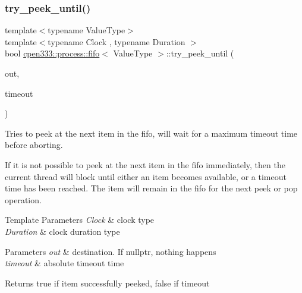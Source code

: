 \subsubsection{\texorpdfstring{try\+\_\+peek\+\_\+until()}{try\_peek\_until()}}
{\footnotesize\ttfamily template$<$typename Value\+Type$>$ \\
template$<$typename Clock , typename Duration $>$ \\
bool \hyperlink{classcpen333_1_1process_1_1fifo}{cpen333\+::process\+::fifo}$<$ Value\+Type $>$\+::try\+\_\+peek\+\_\+until (\begin{DoxyParamCaption}\item[{Value\+Type $\ast$}]{out,  }\item[{const std\+::chrono\+::time\+\_\+point$<$ Clock, Duration $>$ \&}]{timeout }\end{DoxyParamCaption})\hspace{0.3cm}{\ttfamily [inline]}}



Tries to peek at the next item in the fifo, will wait for a maximum timeout time before aborting. 

If it is not possible to peek at the next item in the fifo immediately, then the current thread will block until either an item becomes available, or a timeout time has been reached. The item will remain in the fifo for the next {\ttfamily peek} or {\ttfamily pop} operation.


\begin{DoxyTemplParams}{Template Parameters}
{\em Clock} & clock type \\
\hline
{\em Duration} & clock duration type \\
\hline
\end{DoxyTemplParams}

\begin{DoxyParams}{Parameters}
{\em out} & destination. If {\ttfamily nullptr}, nothing happens \\
\hline
{\em timeout} & absolute timeout time \\
\hline
\end{DoxyParams}
\begin{DoxyReturn}{Returns}
{\ttfamily true} if item successfully peeked, {\ttfamily false} if timeout 
\end{DoxyReturn}
\mbox{\label{classcpen333_1_1process_1_1fifo_a6f3e1f84d8a72e620f44bc5c018b3a9c}} 
